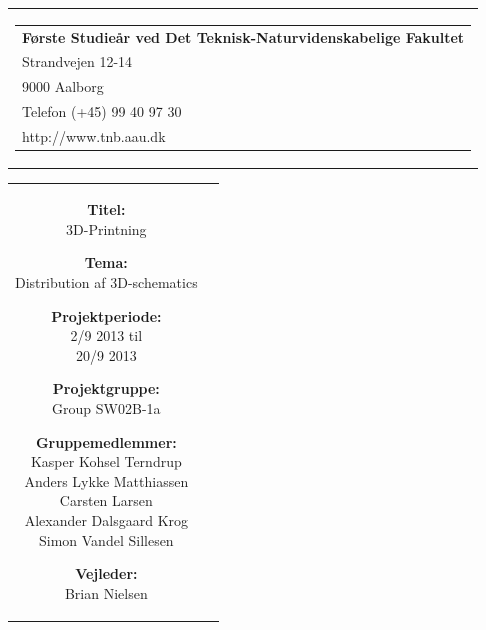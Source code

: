 
% 
\thispagestyle{empty}
{\samepage 
\begin{tabular}{r}
	\parbox{\textwidth}{  
	\hfill \parbox{8cm}{\begin{tabular}{l} %
		{\small \textbf{Første Studieår ved Det Teknisk-Naturvidenskabelige Fakultet}}\\
		{\small Strandvejen 12-14} \\
		{\small 9000 Aalborg} \\
		{\small Telefon (+45) 99 40 97 30} \\
		{\small http://www.tnb.aau.dk}
	\end{tabular}}
	}
\end{tabular}

\begin{tabular}{cc}
	\parbox{8cm}{
	\begin{description}
		\item { \textbf{Titel:}}\\ 
			3D-Printning
    		\item { \textbf{Tema:}}\\ 
			Distribution af 3D-schematics
	\end{description}
	
	\parbox{8cm}{
	\begin{description}
		\item { \textbf{Projektperiode:}}\\
			2/9 2013 til\\
			20/9 2013\\
 		\hspace{4cm}
		\item { \textbf{Projektgruppe:}}\\
  			Group SW02B-1a
 		\hspace{4cm}
		\item {\textbf{Gruppemedlemmer:}}\\
			Kasper Kohsel Terndrup\\
			Anders Lykke Matthiassen\\
			Carsten Larsen\\
			Alexander Dalsgaard Krog\\
			Simon Vandel Sillesen\\
		\hspace{2cm}
		\item { \textbf{Vejleder:}}\\
 			Brian Nielsen\\
  	\end{description}
	}

}
\end{tabular}}
